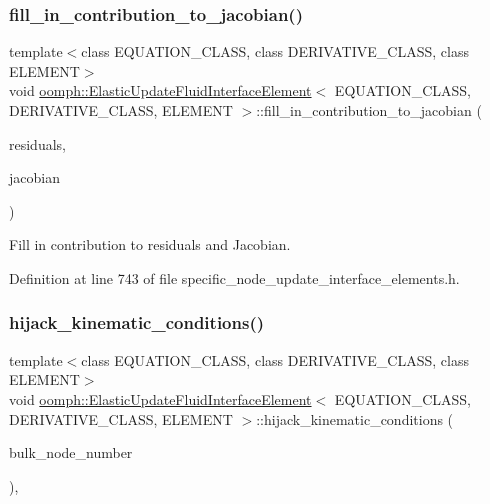 \subsubsection{\texorpdfstring{fill\+\_\+in\+\_\+contribution\+\_\+to\+\_\+jacobian()}{fill\_in\_contribution\_to\_jacobian()}}
{\footnotesize\ttfamily template$<$class E\+Q\+U\+A\+T\+I\+O\+N\+\_\+\+C\+L\+A\+SS, class D\+E\+R\+I\+V\+A\+T\+I\+V\+E\+\_\+\+C\+L\+A\+SS, class E\+L\+E\+M\+E\+NT$>$ \\
void \hyperlink{classoomph_1_1ElasticUpdateFluidInterfaceElement}{oomph\+::\+Elastic\+Update\+Fluid\+Interface\+Element}$<$ E\+Q\+U\+A\+T\+I\+O\+N\+\_\+\+C\+L\+A\+SS, D\+E\+R\+I\+V\+A\+T\+I\+V\+E\+\_\+\+C\+L\+A\+SS, E\+L\+E\+M\+E\+NT $>$\+::fill\+\_\+in\+\_\+contribution\+\_\+to\+\_\+jacobian (\begin{DoxyParamCaption}\item[{Vector$<$ double $>$ \&}]{residuals,  }\item[{Dense\+Matrix$<$ double $>$ \&}]{jacobian }\end{DoxyParamCaption})\hspace{0.3cm}{\ttfamily [inline]}}



Fill in contribution to residuals and Jacobian. 



Definition at line 743 of file specific\+\_\+node\+\_\+update\+\_\+interface\+\_\+elements.\+h.

\mbox{\label{classoomph_1_1ElasticUpdateFluidInterfaceElement_ae82f486496a0647d905ab6ee857de0d0}} 
\subsubsection{\texorpdfstring{hijack\+\_\+kinematic\+\_\+conditions()}{hijack\_kinematic\_conditions()}}
{\footnotesize\ttfamily template$<$class E\+Q\+U\+A\+T\+I\+O\+N\+\_\+\+C\+L\+A\+SS, class D\+E\+R\+I\+V\+A\+T\+I\+V\+E\+\_\+\+C\+L\+A\+SS, class E\+L\+E\+M\+E\+NT$>$ \\
void \hyperlink{classoomph_1_1ElasticUpdateFluidInterfaceElement}{oomph\+::\+Elastic\+Update\+Fluid\+Interface\+Element}$<$ E\+Q\+U\+A\+T\+I\+O\+N\+\_\+\+C\+L\+A\+SS, D\+E\+R\+I\+V\+A\+T\+I\+V\+E\+\_\+\+C\+L\+A\+SS, E\+L\+E\+M\+E\+NT $>$\+::hijack\+\_\+kinematic\+\_\+conditions (\begin{DoxyParamCaption}\item[{const Vector$<$ unsigned $>$ \&}]{bulk\+\_\+node\+\_\+number }\end{DoxyParamCaption})\hspace{0.3cm}{\ttfamily [inline]}, {\ttfamily [private]}}



